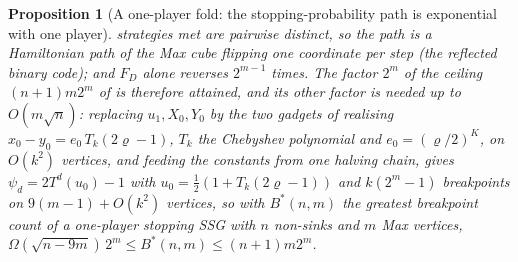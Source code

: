 \documentclass[11pt]{article}
\theoremstyle{plain}
\newtheorem{proposition}[theorem]{Proposition}
\theoremstyle{definition}
\begin{document}
\begin{proposition}[A one-player fold: the stopping-probability path is exponential with one player]
strategies met are pairwise distinct, so the path is a Hamiltonian path of
the Max cube flipping one coordinate per step (the reflected binary code);
and $F_D$ alone reverses $2^{m-1}$ times. The factor $2^{m}$ of the ceiling
$(n+1)m2^{m}$ of  is therefore attained, and its
other factor is needed up to $O(m\sqrt n)$: replacing $u_1,X_0,Y_0$ by the
two gadgets of  realising
$x_0-y_0=e_0\,T_k(2\varrho-1)$, $T_k$ the Chebyshev polynomial and
$e_0=(\varrho/2)^{K}$, on $O(k^{2})$ vertices, and feeding the constants
from one halving chain, gives $\psi_d=2T^{d}(u_0)-1$ with
$u_0=\tfrac12(1+T_k(2\varrho-1))$ and $k(2^{m}-1)$ breakpoints on
$9(m-1)+O(k^{2})$ vertices, so with $B^{\ast}(n,m)$ the greatest breakpoint
count of a one-player stopping SSG with $n$ non-sinks and $m$ Max vertices,
$\Omega(\sqrt{n-9m})\,2^{m}\le B^{\ast}(n,m)\le(n+1)m2^{m}$.
\end{proposition}
\end{document}
